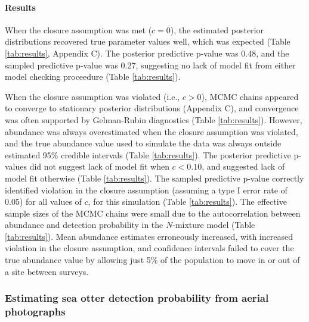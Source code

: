 \documentclass[12pt,english]{article}
\begin{document}
\begin{spacing}{1.9}
    \paragraph{Results}
    When the closure assumption was met ($c=0$), the estimated
    posterior distributions recovered true parameter values well,
    which was expected (Table \ref{tab:results}, Appendix C). The
    posterior predictive p-value was 0.48, and the sampled predictive
    p-value was 0.27, suggesting no lack of model fit from either
    model checking proceedure (Table \ref{tab:results}).

    When the closure assumption was violated (i.e., $c>0$), MCMC
    chains appeared to converge to stationary posterior distributions
    (Appendix C), and convergence was often supported by Gelman-Rubin
    diagnostics (Table \ref{tab:results}).  However, abundance was
    always overestimated when the closure assumption was violated, and
    the true abundance value used to simulate the data was always
    outside estimated 95\% credible intervals (Table
    \ref{tab:results}). The posterior predictive p-values did not
    suggest lack of model fit when $c<0.10$, and suggested lack of
    model fit otherwise (Table \ref{tab:results}). The sampled
    predictive p-value correctly identified violation in the closure
    assumption (assuming a type I error rate of 0.05) for all values
    of $c$, for this simulation (Table \ref{tab:results}). The
    effective sample sizes of the MCMC chains were small due to the
    autocorrelation between abundance and detection probability in the
    $N$-mixture model (Table \ref{tab:results}). Mean abundance
    estimates erroneously increased, with increased violation in the
    closure assumption, and confidence intervals failed to cover the
    true abundance value by allowing just 5\% of the population to
    move in or out of a site between surveys.





    \subsubsection*{Estimating sea otter detection probability from
      aerial photographs}


\end{spacing}
\end{document}
